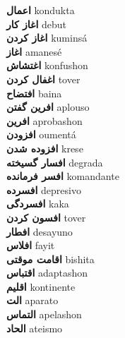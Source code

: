 \textbf{ اعمال  } kondukta \\
\textbf{ اغاز کار  } debut \\
\textbf{ اغاز کردن  } kuminsá \\
\textbf{ اغاز  } amanesé \\
\textbf{ اغتشاش  } konfushon \\
\textbf{ اغفال کردن  } tover \\
\textbf{ افتضاح  } baina \\
\textbf{ افرین گفتن  } aplouso \\
\textbf{ افرین  } aprobashon \\
\textbf{ افزودن  } oumentá \\
\textbf{ افزوده شدن  } krese \\
\textbf{ افسار گسیخته  } degrada \\
\textbf{ افسر فرمانده  } komandante \\
\textbf{ افسرده  } depresivo \\
\textbf{ افسردگی  } kaka \\
\textbf{ افسون کردن  } tover \\
\textbf{ افطار  } desayuno \\
\textbf{ افلاس  } fayit \\
\textbf{ اقامت موقتی  } bishita \\
\textbf{ اقتباس  } adaptashon \\
\textbf{ اقلیم  } kontinente \\
\textbf{ الت  } aparato \\
\textbf{ التماس  } apelashon \\
\textbf{ الحاد  } ateismo \\
